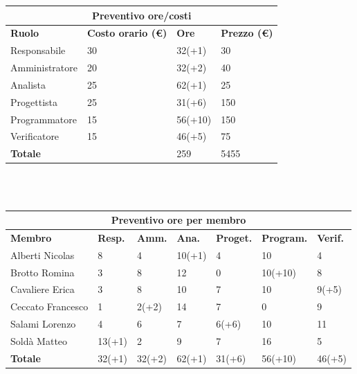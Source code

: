 \documentclass[a4paper, 12pt]{article}
\begin{document}
\begin{center}
	\begin{tabularx}{\textwidth}{|X|X|X|X|}
		\hline
		\multicolumn{4}{|c|}{\textbf{Preventivo ore/costi}}                                      \\
		\hline
		\hline
		\textbf{Ruolo}  & \textbf{Costo orario (\euro)} & \textbf{Ore} & \textbf{Prezzo (\euro)} \\
		\hline
		Responsabile    & 30                            & 32(+1)       & 30                     \\
		\hline
		Amministratore  & 20                            & 32(+2)       & 40                      \\
		\hline
		Analista        & 25                            & 62(+1)       & 25                       \\
		\hline
		Progettista     & 25                            & 31(+6)       & 150                      \\
		\hline
		Programmatore   & 15                            & 56(+10)       & 150                      \\
		\hline
		Verificatore    & 15                            & 46(+5)       & 75                      \\
		\hline
		\hline
		\textbf{Totale} &                               & 259          & 5455                    \\
		\hline
	\end{tabularx}\\[8pt]
	\mbox{}\\
\end{center}

\begin{center}
	\begin{tabularx}{\textwidth}{|X|X|X|X|X|X|X|}
		\hline
		\multicolumn{7}{|c|}{\textbf{Preventivo ore per membro}}                                      \\
		\hline
		\hline
		\textbf{Membro}  & \textbf{Resp.} & \textbf{Amm.} & \textbf{Ana.} &
		\textbf{Proget.} & \textbf{Program.} & \textbf{Verif.} \\
		\hline
		Alberti Nicolas    	&8 	&4	&10(+1)	&4	&10 &4	\\
		\hline
		Brotto Romina    	&3 	&8	&12	&0	&10(+10) &8	\\
		\hline
		Cavaliere Erica    	&3 	&8  &10  &7 &10 &9(+5)	\\
		\hline
		Ceccato Francesco   &1 	&2(+2)  &14 &7 &0 &9	\\
		\hline
		Salami Lorenzo    	&4 	&6  &7 &6(+6) &10 &11	\\
		\hline
		Soldà Matteo    	&13(+1)	&2  &9 &7 &16 &5	\\
		\hline
		\hline
		\textbf{Totale} 	&32(+1) &32(+2) &62(+1) &31(+6) &56(+10) &46(+5)	\\
		\hline
	\end{tabularx}\\[8pt]
	\mbox{}\\
\end{center}
\end{document}
